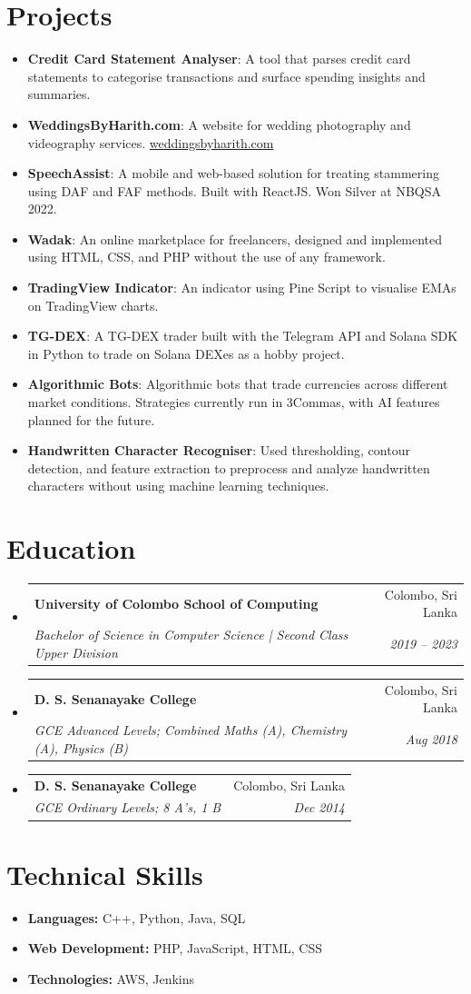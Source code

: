 \documentclass[letterpaper,11pt]{article}
\makeatletter
\newcommand{\resumeItem}[2]{
  \item\small{
    \textbf{#1}{: #2 \vspace{-2pt}}
  }
}
\newcommand{\resumeSubheading}[4]{
  \vspace{-1pt}\item
    \begin{tabular*}{0.97\textwidth}[t]{l@{\extracolsep{\fill}}r}
      \textbf{#1} & #2 \\
      \textit{\small#3} & \textit{\small #4} \\
    \end{tabular*}\vspace{-5pt}
}
\newcommand{\resumeSubItem}[2]{\resumeItem{#1}{#2}\vspace{-4pt}}
\newcommand{\resumeSubHeadingListStart}{\begin{itemize}[leftmargin=*]}
\newcommand{\resumeSubHeadingListEnd}{\end{itemize}}
\makeatother
\begin{document}
\section{Projects}
\resumeSubHeadingListStart
  \resumeSubItem{Credit Card Statement Analyser}
    {A tool that parses credit card statements to categorise transactions and surface spending insights and summaries.}
  \resumeSubItem{WeddingsByHarith.com}
    {A website for wedding photography and videography services. \href{https://weddingsbyharith.com}{weddingsbyharith.com}}
  \resumeSubItem{SpeechAssist}
    {A mobile and web-based solution for treating stammering using DAF and FAF methods. Built with ReactJS. Won Silver at NBQSA 2022.}
  \resumeSubItem{Wadak}
    {An online marketplace for freelancers, designed and implemented using HTML, CSS, and PHP without the use of any framework.}
  \resumeSubItem{TradingView Indicator}
    {An indicator using Pine Script to visualise EMAs on TradingView charts.}
  \resumeSubItem{TG-DEX}
    {A TG-DEX trader built with the Telegram API and Solana SDK in Python to trade on Solana DEXes as a hobby project.}
  \resumeSubItem{Algorithmic Bots}
    {Algorithmic bots that trade currencies across different market conditions. Strategies currently run in 3Commas, with AI features planned for the future.}
  \resumeSubItem{Handwritten Character Recogniser}
    {Used thresholding, contour detection, and feature extraction to preprocess and analyze handwritten characters without using machine learning techniques.}
\resumeSubHeadingListEnd

\section{Education}
\resumeSubHeadingListStart
  \resumeSubheading
    {University of Colombo School of Computing}{Colombo, Sri Lanka}
    {Bachelor of Science in Computer Science | Second Class Upper Division}{2019 -- 2023}
  \resumeSubheading
    {D. S. Senanayake College}{Colombo, Sri Lanka}
    {GCE Advanced Levels; Combined Maths (A), Chemistry (A), Physics (B)}{Aug 2018}
  \resumeSubheading
    {D. S. Senanayake College}{Colombo, Sri Lanka}
    {GCE Ordinary Levels; 8 A's, 1 B}{Dec 2014}
\resumeSubHeadingListEnd

\section{Technical Skills}
\resumeSubHeadingListStart
  \item \textbf{Languages:} C++, Python, Java, SQL
  \item \textbf{Web Development:} PHP, JavaScript, HTML, CSS
  \item \textbf{Technologies:} AWS, Jenkins
\resumeSubHeadingListEnd

\end{document}
